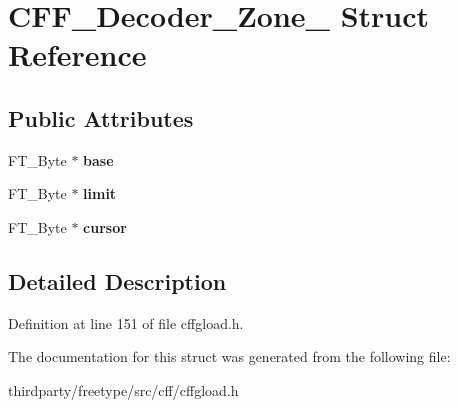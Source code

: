 \hypertarget{struct_c_f_f___decoder___zone__}{}\section{C\+F\+F\+\_\+\+Decoder\+\_\+\+Zone\+\_\+ Struct Reference}
\label{struct_c_f_f___decoder___zone__}
\subsection*{Public Attributes}
\begin{DoxyCompactItemize}
\item 
\mbox{\label{struct_c_f_f___decoder___zone___adffd8270fea17f125a1615d7a6cc09c2}} 
F\+T\+\_\+\+Byte $\ast$ {\bfseries base}
\item 
\mbox{\label{struct_c_f_f___decoder___zone___ad3e3efa2e2b7dd69292757fbf7e63e53}} 
F\+T\+\_\+\+Byte $\ast$ {\bfseries limit}
\item 
\mbox{\label{struct_c_f_f___decoder___zone___a5ac12c9c151964cee76b5b11e5c22453}} 
F\+T\+\_\+\+Byte $\ast$ {\bfseries cursor}
\end{DoxyCompactItemize}


\subsection{Detailed Description}


Definition at line 151 of file cffgload.\+h.



The documentation for this struct was generated from the following file\+:\begin{DoxyCompactItemize}
\item 
thirdparty/freetype/src/cff/cffgload.\+h\end{DoxyCompactItemize}
